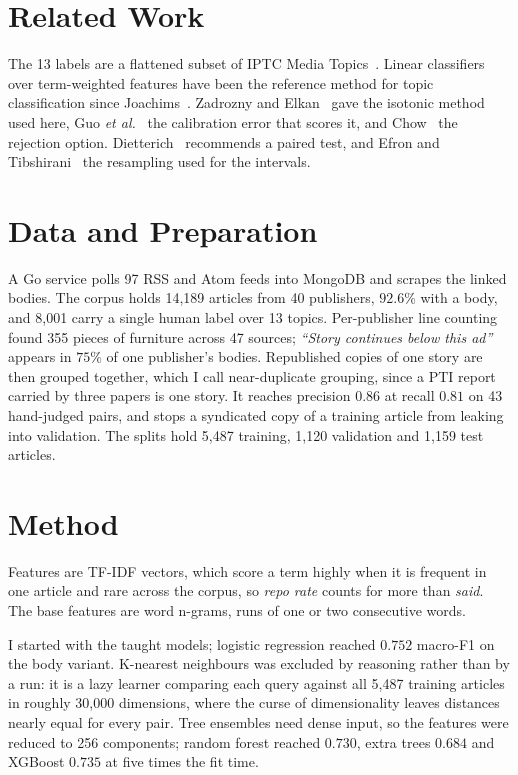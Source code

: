 \documentclass[conference]{IEEEtran}
\begin{document}
\section{Related Work}

The 13 labels are a flattened subset of IPTC Media Topics~\cite{iptc}. Linear classifiers
over term-weighted features have been the reference method for topic classification since
Joachims~\cite{joachims}. Zadrozny and Elkan~\cite{zadrozny} gave the isotonic method used
here, Guo \textit{et al.}~\cite{guo} the calibration error that scores it, and
Chow~\cite{chow} the rejection option. Dietterich~\cite{dietterich} recommends a paired
test, and Efron and Tibshirani~\cite{efron} the resampling used for the intervals.
\section{Data and Preparation}

A Go service polls 97 RSS and Atom feeds into MongoDB and scrapes the linked bodies. The
corpus holds 14{,}189 articles from 40 publishers, $92.6\%$ with a body, and 8{,}001 carry
a single human label over 13 topics. Per-publisher line counting found 355 pieces of
furniture across 47 sources; \textit{``Story continues below this ad''} appears in $75\%$
of one publisher's bodies. Republished
copies of one story are then grouped together, which I call near-duplicate grouping, since
a PTI report carried by three papers is one story. It reaches precision $0.86$ at recall
$0.81$ on 43 hand-judged pairs, and stops a syndicated copy of a training article from
leaking into validation. The splits hold 5{,}487 training, 1{,}120 validation and 1{,}159
test articles.
\section{Method}

Features are TF-IDF vectors, which score a term highly when it is frequent in one article
and rare across the corpus, so \textit{repo rate} counts for more than \textit{said}. The
base features are word n-grams, runs of one or two consecutive words.

I started with the taught models; logistic regression reached $0.752$ macro-F1 on the body
variant. K-nearest neighbours was excluded by reasoning rather than by a run: it is a lazy
learner comparing each query against all 5{,}487 training articles in roughly 30{,}000
dimensions, where the curse of dimensionality leaves distances nearly equal for every
pair. Tree ensembles need dense input, so the features were reduced to 256 components;
random forest reached $0.730$, extra trees $0.684$ and XGBoost $0.735$ at five times the
fit time.
\end{document}
